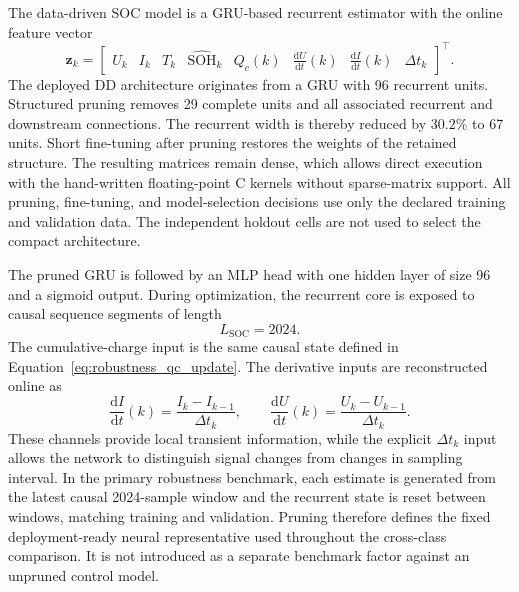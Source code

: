 The data-driven SOC model is a GRU-based recurrent estimator with the online feature vector
\begin{equation}
    \mathbf{z}_k=
    \begin{bmatrix}
        U_k & I_k & T_k & \widehat{\mathrm{SOH}}_k & Q_c(k) &
        \frac{\mathrm{d}U}{\mathrm{d}t}(k) &
        \frac{\mathrm{d}I}{\mathrm{d}t}(k) &
        \Delta t_k
    \end{bmatrix}^{\top}.
    \label{eq:robustness_dd_feature_vector}
\end{equation}
The deployed DD architecture originates from a GRU with 96 recurrent units. Structured pruning removes 29 complete units and all associated recurrent and downstream connections. The recurrent width is thereby reduced by $30.2\%$ to 67 units. Short fine-tuning after pruning restores the weights of the retained structure. The resulting matrices remain dense, which allows direct execution with the hand-written floating-point C kernels without sparse-matrix support. All pruning, fine-tuning, and model-selection decisions use only the declared training and validation data. The independent holdout cells are not used to select the compact architecture.

The pruned GRU is followed by an MLP head with one hidden layer of size 96 and a sigmoid output. During optimization, the recurrent core is exposed to causal sequence segments of length
\begin{equation}
    L_{\mathrm{SOC}}=2024.
    \label{eq:robustness_soc_sequence_length}
\end{equation}
The cumulative-charge input is the same causal state defined in Equation~\eqref{eq:robustness_qc_update}. The derivative inputs are reconstructed online as
\begin{equation}
    \frac{\mathrm{d}I}{\mathrm{d}t}(k)=\frac{I_k-I_{k-1}}{\Delta t_k},
    \qquad
    \frac{\mathrm{d}U}{\mathrm{d}t}(k)=\frac{U_k-U_{k-1}}{\Delta t_k}.
    \label{eq:robustness_derivative_features}
\end{equation}
These channels provide local transient information, while the explicit $\Delta t_k$ input allows the network to distinguish signal changes from changes in sampling interval. In the primary robustness benchmark, each estimate is generated from the latest causal 2024-sample window and the recurrent state is reset between windows, matching training and validation. Pruning therefore defines the fixed deployment-ready neural representative used throughout the cross-class comparison. It is not introduced as a separate benchmark factor against an unpruned control model.

